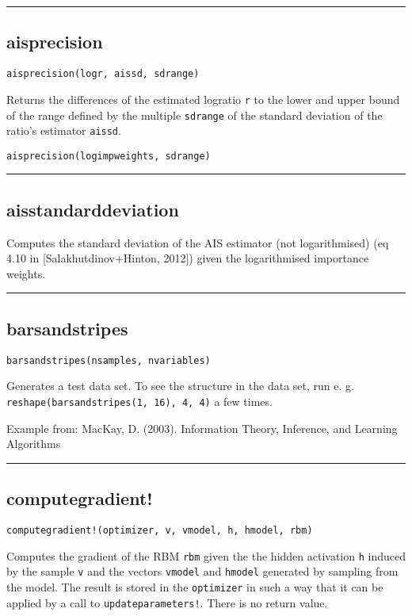 \noindent\rule{\textwidth}{1pt}
\subsection*{aisprecision}
\begin{verbatim}
aisprecision(logr, aissd, sdrange)
\end{verbatim}
Returns the differences of the estimated logratio \texttt{r} to the lower and upper bound of the range defined by the multiple \texttt{sdrange} of the standard deviation of the ratio's estimator \texttt{aissd}.

\begin{verbatim}
aisprecision(logimpweights, sdrange)
\end{verbatim}
\noindent\rule{\textwidth}{1pt}
\subsection*{aisstandarddeviation}
Computes the standard deviation of the AIS estimator (not logarithmised) (eq 4.10 in [Salakhutdinov+Hinton, 2012]) given the logarithmised importance weights.

\noindent\rule{\textwidth}{1pt}
\subsection*{barsandstripes}
\begin{verbatim}
barsandstripes(nsamples, nvariables)
\end{verbatim}
Generates a test data set. To see the structure in the data set, run e. g. \texttt{reshape(barsandstripes(1, 16), 4, 4)} a few times.

Example from: MacKay, D. (2003). Information Theory, Inference, and Learning Algorithms

\noindent\rule{\textwidth}{1pt}
\subsection*{computegradient!}
\begin{verbatim}
computegradient!(optimizer, v, vmodel, h, hmodel, rbm)
\end{verbatim}
Computes the gradient of the RBM \texttt{rbm} given the the hidden activation \texttt{h} induced by the sample \texttt{v} and the vectors \texttt{vmodel} and \texttt{hmodel} generated by sampling from the model. The result is stored in the \texttt{optimizer} in such a way that it can be applied by a call to \texttt{updateparameters!}. There is no return value.

